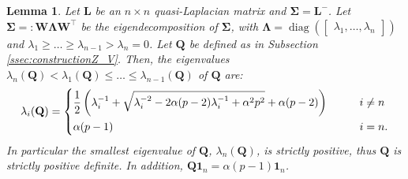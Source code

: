 \documentclass[12pt]{article}
\theoremstyle{plain}
\newtheorem{lemma}[theorem]{Lemma}
\theoremstyle{remark}
\newcommand{\round}[1]{\left( #1 \right)}
\newcommand{\onen}[0]{{\mathbf{1}_{n}}}
\newcommand{\latMatr}[1]{\mathbf{#1}}          %
\newcommand{\grMatr}[1]{{\boldsymbol{#1}}}   %
\DeclareMathOperator{\diag}{diag}
\begin{document}
    
    \begin{lemma}
        \label{lem:eigenvaluesQ}
        Let $\latMatr L$ be an $n \times n$ quasi-Laplacian matrix and ${\grMatr{\Sigma}}={\latMatr{L}}^-$. Let ${\grMatr{\Sigma}} =: \latMatr W \grMatr{\Lambda} \latMatr W^\top$ be the eigendecomposition of ${\grMatr{\Sigma}}$, with $\grMatr{\Lambda} = \diag\round{
            \begin{bmatrix}
                \lambda_1,\dots,\lambda_n
            \end{bmatrix}
        }$ and $\lambda_1\geq\dots\geq\lambda_{n-1}>\lambda_n=0$. Let $\latMatr Q$ be defined as in Subsection \ref{ssec:constructionZ_V}. Then, the eigenvalues $\lambda_n(\latMatr Q)<\lambda_1(\latMatr Q)\leq \dots \leq \lambda_{n-1}(\latMatr Q)$ of $\latMatr Q$ are:
        \begin{equation*}
            \lambda_i(\latMatr Q) = \begin{dcases}
                 \frac{1}{2} \round{\lambda_i^{-1}+\sqrt{\lambda_i^{-2}-2\alpha(p-2)\lambda_i^{-1}+\alpha^2 p^2}+\alpha(p-2)}\qquad &i\ne n\\
                \alpha(p-1)\qquad &\text{$i=n$}.
            \end{dcases}
        \end{equation*}
        In particular the smallest eigenvalue of $\latMatr Q$, $\lambda_n(\latMatr Q)$, is strictly positive, thus $\latMatr Q$ is strictly positive definite. In addition, $\latMatr Q \onen=\alpha(p-1)\onen$.
    \end{lemma}
    
\end{document}
